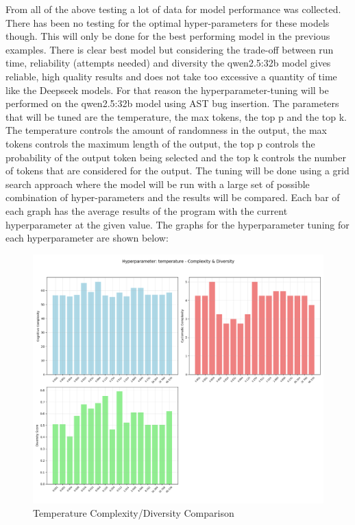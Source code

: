 \documentclass[12pt]{extarticle}
\begin{document}
From all of the above testing a lot of data for model performance was collected. There has been no testing for the optimal hyper-parameters for these models though. This will only be done for the best performing model in the previous examples. There is clear best model but considering the trade-off between run time, reliability (attempts needed) and diversity the qwen2.5:32b model gives reliable, high quality results and does not take too excessive a quantity of time like the Deepseek models. For that reason the hyperparameter-tuning will be performed on the qwen2.5:32b model using AST bug insertion. The parameters that will be tuned are the temperature, the max tokens, the top p and the top k. The temperature controls the amount of randomness in the output, the max tokens controls the maximum length of the output, the top p controls the probability of the output token being selected and the top k controls the number of tokens that are considered for the output. The tuning will be done using a grid search approach where the model will be run with a large set of possible combination of hyper-parameters and the results will be compared. Each bar of each graph has the average results of the program with the current hyperparameter at the given value. The graphs for the hyperparameter tuning for each hyperparameter are shown below:

\begin{figure}[H]
\centering
\includegraphics[width=0.7\linewidth]{Images/Hyperparam_temperature_Complexity.png}
\caption{Temperature Complexity/Diversity Comparison}
\label{fig:Complexity_Comparison_Threads}
\end{figure}
\end{document}
